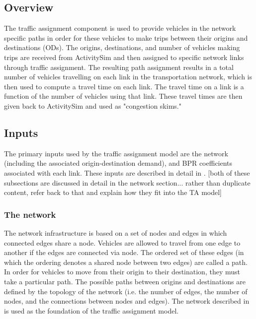 \subsection{Overview}
The traffic assignment component is used to provide vehicles in the network specific paths in order for these vehicles to make trips between their origins and destinations (ODs). The origins, destinations, and number of vehicles making trips are received from ActivitySim and then assigned to specific network links through traffic assignment. The resulting path assignment results in a total number of vehicles travelling on each link in the transportation network, which is then used to compute a travel time on each link. The travel time on a link is a function of the number of vehicles using that link. These travel times are then given back to ActivitySim and used as "congestion skims." 


\subsection{Inputs}
The primary inputs used by the traffic assignment model are the network (including the associated origin-destination demand), and BPR coefficients associated with each link. These inputs are described in detail in .
[both of these subsections are discussed in detail in the network section... rather than duplicate content, refer back to that and explain how they fit into the TA model]


\subsubsection{The network}
The network infrastructure is based on a set of nodes and edges in which connected edges share a node. Vehicles are allowed to travel from one edge to another if the edges are connected via node. The ordered set of these edges (in which the ordering denotes a shared node between two edges) are called a path. In order for vehicles to move from their origin to their destination, they must take a particular path. The possible paths between origins and destinations are defined by the topology of the network (i.e. the number of edges, the number of nodes, and the connections between nodes and edges). The network described in  is used as the foundation of the traffic assignment model. 


